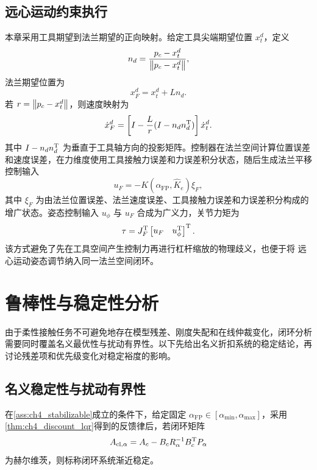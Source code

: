 \subsection{远心运动约束执行}
\label{subsec:ch4_rcm_mapping}

本章采用工具期望到法兰期望的正向映射。给定工具尖端期望位置 $x_t^d$，定义
\begin{equation}
  n_d=\frac{p_c-x_t^d}{\left\lVert p_c-x_t^d\right\rVert},
  \label{eq:ch4_nd}
\end{equation}
法兰期望位置为
\begin{equation}
  x_F^d=x_t^d+Ln_d .
  \label{eq:ch4_xf}
\end{equation}
若 $r=\left\lVert p_c-x_t^d\right\rVert$，则速度映射为
\begin{equation}
  \dot x_F^d=\left[I-\frac{L}{r}(I-n_dn_d^{\mathrm{T}})\right]\dot x_t^d .
  \label{eq:ch4_vf}
\end{equation}
其中 $I-n_dn_d^{\mathrm{T}}$ 为垂直于工具轴方向的投影矩阵。控制器在法兰空间计算位置误差和速度误差，在力维度使用工具接触力误差和力误差积分状态，随后生成法兰平移控制输入
\begin{equation}
  u_F=-K(\alpha_{\mathrm{FP}},\hat K_e)\xi_F,
  \label{eq:ch4_uF}
\end{equation}
其中 $\xi_F$ 为由法兰位置误差、法兰速度误差、工具接触力误差和力误差积分构成的增广状态。姿态控制输入 $u_\phi$ 与 $u_F$ 合成为广义力，关节力矩为
\begin{equation}
  \tau=J_F^{\mathrm{T}}\begin{bmatrix}u_F&u_\phi^{\mathrm{T}}\end{bmatrix}^{\mathrm{T}} .
  \label{eq:ch4_tau}
\end{equation}
该方式避免了先在工具空间产生控制力再进行杠杆缩放的物理歧义，也便于将 远心运动姿态调节纳入同一法兰空间闭环。
\section{鲁棒性与稳定性分析}
\label{sec:ch4_theory}

由于柔性接触任务不可避免地存在模型残差、刚度失配和在线仲裁变化，闭环分析需要同时覆盖名义最优性与扰动有界性。以下先给出名义折扣系统的稳定结论，再讨论残差项和优先级变化对稳定裕度的影响。

\subsection{名义稳定性与扰动有界性}
\label{subsec:ch4_nominal_theory}

\begin{theorem}
\label{thm:ch4_fixed_stability}
在\cref{ass:ch4_stabilizable}成立的条件下，给定固定 $\alpha_{\mathrm{FP}}\in[\alpha_{\min},\alpha_{\max}]$，采用\cref{thm:ch4_discount_lqr}得到的反馈律后，若闭环矩阵
\begin{equation}
  A_{\mathrm{cl},\alpha}=A_c-B_cR_\alpha^{-1}B_c^{\mathrm{T}}P_\alpha
  \label{eq:ch4_Acl}
\end{equation}
为赫尔维茨，则标称闭环系统渐近稳定。
\end{theorem}

